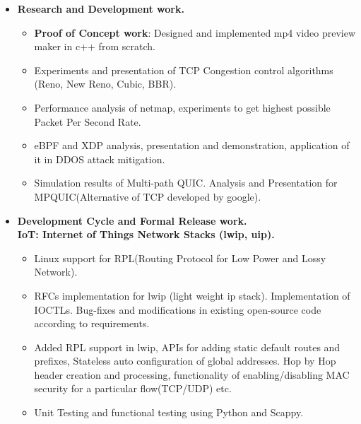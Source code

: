 \begin{itemize}
	\item \textbf{Research and Development work.}\\[-0.6cm]
	\begin{itemize}  	
		\item {\bf Proof of Concept work}: Designed and implemented mp4 video preview maker in c++ from scratch. \\[-0.5cm]
		\item Experiments and presentation of TCP Congestion control algorithms (Reno, New Reno, Cubic, BBR).\\[-0.5cm]
		\item Performance analysis of netmap, experiments to get highest possible Packet Per Second Rate.\\[-0.5cm]
		\item eBPF and XDP analysis, presentation and demonstration, application of it in DDOS attack mitigation.\\[-0.5cm] 
		\item Simulation results of Multi-path QUIC. Analysis and Presentation for MPQUIC(Alternative of TCP developed by google).\\[-0.5cm]
	\end{itemize}
	\item \textbf{Development Cycle and Formal Release work.} \\
	\textbf{IoT: Internet of Things Network Stacks (lwip, uip).}\\[-0.6cm]
	\begin{itemize} 
	 \item Linux support for RPL(Routing Protocol for Low Power and Lossy Network).\\[-0.5cm]
	 \item RFCs implementation for lwip (light weight ip stack). Implementation of IOCTLs. Bug-fixes and modifications in existing open-source code according to requirements.\\[-0.5cm]
	 \item Added RPL support in lwip, APIs for adding static default routes and prefixes, Stateless auto configuration of global addresses. Hop by Hop header creation and processing, functionality of enabling/disabling MAC security for a particular flow(TCP/UDP) etc.\\[-0.5cm]
	 \item Unit Testing and functional testing using Python and Scappy.\\[-0.5cm]

\end{itemize}
\end{itemize}
